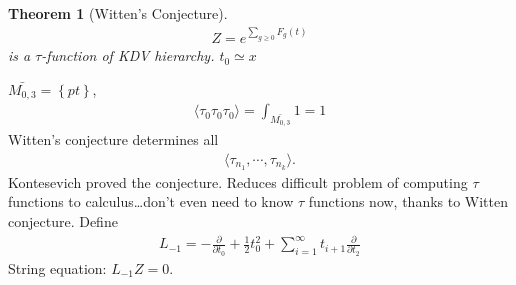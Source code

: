 \documentclass[12pt,reqno]{amsart}
\numberwithin{equation}{section}  %
\newcommand{\p}{\partial}
\newtheorem{theorem}{Theorem}[section]
\begin{document}
%
%
%
%
%                
%
%
%
%
\begin{theorem}[Witten's Conjecture]
    \begin{gather*}
	Z = e^{\sum_{g \ge 0} F_{g}(t)}
    \end{gather*}
    is a $\tau$-function of KDV hierarchy. $t_{0} \simeq x$
    \label{thm:witt}
\end{theorem}
%
%
$\bar{M_{0,3}} = \left\{ pt \right\}$, 
\begin{gather*}
    \langle \tau_{0} \tau_{0} \tau_{0} \rangle  = \int_{\bar{M_{0,3}}} 1 =1
\end{gather*}
Witten's conjecture determines all
\begin{gather*}
    \langle \tau_{n_{1}}, \cdots, \tau_{n_{k}} \rangle. 
\end{gather*}
Kontesevich proved the conjecture. Reduces difficult problem of computing $\tau$
functions to calculus\ldots don't even need to know $\tau$ functions now, thanks
to Witten conjecture. Define
\begin{gather*}
    L_{-1} = -\frac{\p}{\p t_{0}} + \frac{1}{2} t_{0}^{2} + \sum_{i=1}^{\infty}
    t_{i+1} \frac{\p}{\p t_{2}}
\end{gather*}
String equation: $L_{-1} Z = 0$.
%
\end{document}
